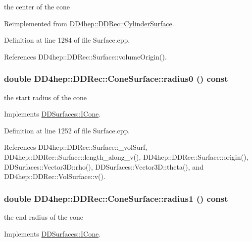 the center of the cone 

Reimplemented from \hyperlink{class_d_d4hep_1_1_d_d_rec_1_1_cylinder_surface_a2f781fa234e46d60caa6d07271c2e922}{DD4hep::DDRec::CylinderSurface}.

Definition at line 1284 of file Surface.cpp.

References DD4hep::DDRec::Surface::volumeOrigin().\hypertarget{class_d_d4hep_1_1_d_d_rec_1_1_cone_surface_afd2818bb0856bcc8bcf4dc8f13021487}{
\subsubsection[{radius0}]{\setlength{\rightskip}{0pt plus 5cm}double DD4hep::DDRec::ConeSurface::radius0 () const}}
\label{class_d_d4hep_1_1_d_d_rec_1_1_cone_surface_afd2818bb0856bcc8bcf4dc8f13021487}


the start radius of the cone 

Implements \hyperlink{class_d_d_surfaces_1_1_i_cone_af7be60438f58e45d5e82a2d826a0a7d7}{DDSurfaces::ICone}.

Definition at line 1252 of file Surface.cpp.

References DD4hep::DDRec::Surface::\_\-volSurf, DD4hep::DDRec::Surface::length\_\-along\_\-v(), DD4hep::DDRec::Surface::origin(), DDSurfaces::Vector3D::rho(), DDSurfaces::Vector3D::theta(), and DD4hep::DDRec::VolSurface::v().\hypertarget{class_d_d4hep_1_1_d_d_rec_1_1_cone_surface_a06f5fb8f4f87c1adbe0c50f26c41a7ad}{
\subsubsection[{radius1}]{\setlength{\rightskip}{0pt plus 5cm}double DD4hep::DDRec::ConeSurface::radius1 () const}}
\label{class_d_d4hep_1_1_d_d_rec_1_1_cone_surface_a06f5fb8f4f87c1adbe0c50f26c41a7ad}


the end radius of the cone 

Implements \hyperlink{class_d_d_surfaces_1_1_i_cone_a58fb9fc961cc2580a6cc1d5fda4d817e}{DDSurfaces::ICone}.

